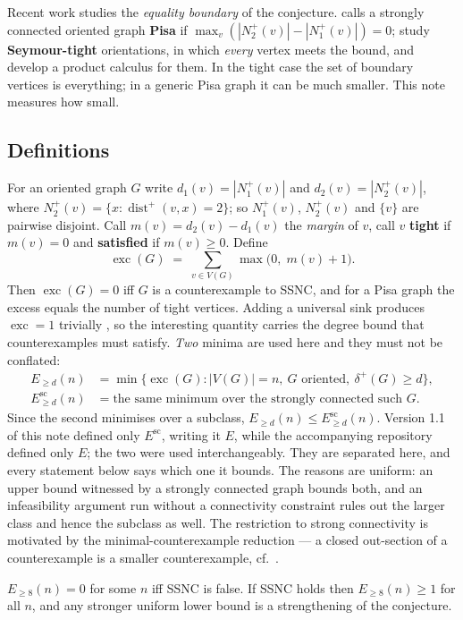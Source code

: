 \documentclass[11pt]{amsart}
\theoremstyle{remark}
\newcommand{\exc}{\operatorname{exc}}
\newcommand{\Esc}{E^{\mathrm{sc}}}
\begin{document}
Recent work studies the \emph{equality boundary} of the conjecture.
\cite{Halkiewicz2026} calls a strongly connected oriented graph \textbf{Pisa}
if $\max_v (|N_2^+(v)| - |N_1^+(v)|) = 0$; \cite{GuoKangZwaneveld2026} study
\textbf{Seymour-tight} orientations, in which \emph{every} vertex meets the
bound, and develop a product calculus for them. In the tight case the set of
boundary vertices is everything; in a generic Pisa graph it can be much
smaller. This note measures how small.

\subsection*{Definitions}
For an oriented graph $G$ write $d_1(v) = |N_1^+(v)|$ and
$d_2(v) = |N_2^+(v)|$, where $N_2^+(v) = \{x : \operatorname{dist}^+(v, x) =
2\}$; so $N_1^+(v)$, $N_2^+(v)$ and $\{v\}$ are pairwise disjoint. Call
$m(v) = d_2(v) - d_1(v)$ the \emph{margin} of $v$, call $v$ \textbf{tight} if
$m(v) = 0$ and \textbf{satisfied} if $m(v) \ge 0$. Define
\[
\exc(G) \;=\; \sum_{v \in V(G)} \max\bigl(0,\; m(v) + 1\bigr).
\]
Then $\exc(G) = 0$ iff $G$ is a counterexample to SSNC, and for a Pisa graph
the excess equals the number of tight vertices. Adding a universal sink
produces $\exc = 1$ trivially \cite[\S1]{GuoKangZwaneveld2026}, so the
interesting quantity carries the degree bound that counterexamples must
satisfy. \emph{Two} minima are used here and they must not be conflated:
\begin{align*}
E_{\ge d}(n) &= \min\{\exc(G) : |V(G)| = n,\ G \text{ oriented},\
   \delta^+(G) \ge d\},\\
\Esc_{\ge d}(n) &= \text{the same minimum over the strongly connected such } G.
\end{align*}
Since the second minimises over a subclass, $E_{\ge d}(n) \le \Esc_{\ge d}(n)$.
Version 1.1 of this note defined only $\Esc$, writing it $E$, while the
accompanying repository defined only $E$; the two were used interchangeably.
They are separated here, and every statement below says which one it bounds.
The reasons are uniform: an upper bound witnessed by a strongly connected
graph bounds both, and an infeasibility argument run without a connectivity
constraint rules out the larger class and hence the subclass as well. The
restriction to strong connectivity is motivated by the minimal-counterexample
reduction --- a closed out-section of a counterexample is a smaller
counterexample, cf.\ \cite{EspunyDiazGiraoGranetKronenberg2024}.

$E_{\ge 8}(n) = 0$ for some $n$ iff SSNC is false. If SSNC holds then
$E_{\ge 8}(n) \ge 1$ for all $n$, and any stronger uniform lower bound
is a strengthening of the conjecture.
\end{document}
